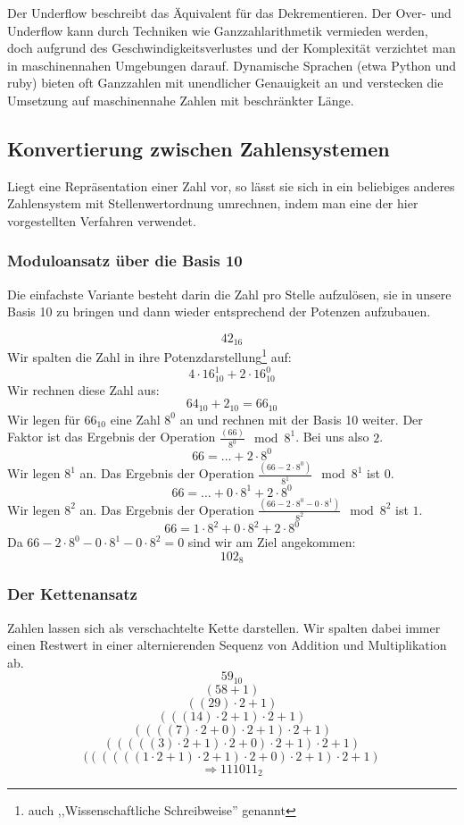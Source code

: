 Der Underflow beschreibt das Äquivalent für das Dekrementieren.
Der Over- und Underflow kann durch Techniken wie Ganzzahlarithmetik vermieden
werden, doch aufgrund des Geschwindigkeitsverlustes und der Komplexität
verzichtet man in maschinennahen Umgebungen darauf. Dynamische Sprachen
(etwa Python und ruby) bieten oft Ganzzahlen mit unendlicher Genauigkeit
an und verstecken die Umsetzung auf maschinennahe Zahlen mit beschränkter
Länge.
%
\subsection{Konvertierung zwischen Zahlensystemen}
%
Liegt eine Repräsentation einer Zahl vor, so lässt sie sich in ein beliebiges
anderes Zahlensystem mit Stellenwertordnung umrechnen, indem man eine der
hier vorgestellten Verfahren verwendet.
%
\subsubsection{Moduloansatz über die Basis 10}
%
Die einfachste Variante besteht darin die Zahl pro Stelle aufzulösen,
sie in unsere Basis 10 zu bringen und dann wieder entsprechend der Potenzen
aufzubauen.

\[ 42_{16} \]
%
Wir spalten die Zahl in ihre Potenzdarstellung\footnote{%
auch ,,Wissenschaftliche Schreibweise'' genannt} auf:
\[ 4\cdot 16_{10}^1 + 2\cdot 16_{10}^0 \]
%
Wir rechnen diese Zahl aus:
\[ 64_{10} + 2_{10} = 66_{10} \]
%
Wir legen für $66_{10}$ eine Zahl $8^0$ an und rechnen mit der Basis 10 weiter.
Der Faktor ist das Ergebnis der Operation $\frac{(66)}{8^0}\mod{8^1}$.
Bei uns also $2$.
\[ 66 = \ldots + 2\cdot 8^0 \]
%
Wir legen $8^1$ an. Das Ergebnis der Operation
$\frac{(66-2\cdot8^0)}{8^1}\mod{8^1}$ ist $0$.
\[ 66 = \ldots + 0\cdot 8^1 + 2\cdot 8^0 \]
%
Wir legen $8^2$ an. Das Ergebnis der Operation
$\frac{(66-2\cdot8^0-0\cdot8^1)}{8^2}\mod{8^2}$ ist $1$.
\[ 66 = 1\cdot8^2 + 0\cdot8^2 + 2\cdot8^0 \]
%
Da $66-2\cdot8^0-0\cdot8^1-0\cdot8^2 = 0$ sind wir am Ziel angekommen:
\[ 102_{8} \]

\subsubsection{Der Kettenansatz}
%
Zahlen lassen sich als verschachtelte Kette darstellen.
Wir spalten dabei immer einen Restwert in einer alternierenden
Sequenz von Addition und Multiplikation ab.
%
\[
  59_{10}
\] \[
  (58 + 1)
\] \[
  ((29)\cdot2 + 1)
\] \[
  (((14)\cdot2 + 1)\cdot2 + 1)
\] \[
  ((((7)\cdot2 + 0)\cdot2 + 1)\cdot2 + 1)
\] \[
  (((((3)\cdot2 + 1)\cdot2 + 0)\cdot2 + 1)\cdot2 + 1)
\] \[
  ((((((1\cdot2 + 1)\cdot2 + 1)\cdot2 + 0)\cdot2 + 1)\cdot2 + 1)
\] \[
  \Rightarrow 111011_2
\]

